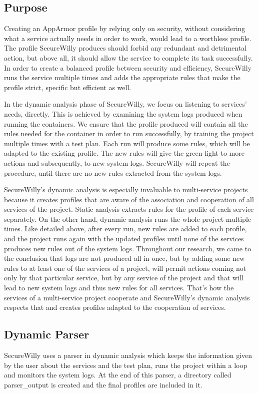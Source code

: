 \subsection{Purpose}
Creating an AppArmor profile by relying only on security, without considering what a service actually needs in order to work, would lead to a worthless profile. The profile SecureWilly produces should forbid any redundant and detrimental action, but above all, it should allow the service to complete its task successfully. In order to create a balanced profile between security and efficiency, SecureWilly runs the service multiple times and adds the appropriate rules that make the profile strict, specific but efficient as well.

In the dynamic analysis phase of SecureWilly, we focus on listening to services' needs, directly. This is achieved by examining the system logs produced when running the containers. We ensure that the profile produced will contain all the rules needed for the container in order to run successfully, by training the project multiple times with a test plan. Each run will produce some rules, which will be adapted to the existing profile. The new rules will give the green light to more actions and subsequently, to new system logs. SecureWilly will repeat the procedure, until there are no new rules extracted from the system logs.

SecureWilly's dynamic analysis is especially invaluable to multi-service projects because it creates profiles that are aware of the association and cooperation of all services of the project. Static analysis extracts rules for the profile of each service separately. On the other hand, dynamic analysis runs the whole project multiple times. Like detailed above, after every run, new rules are added to each profile, and the project runs again with the updated profiles until none of the services produces new rules out of the system logs. Throughout our research, we came to the conclusion that logs are not produced all in once, but by adding some new rules to at least one of the services of a project, will permit actions coming not only by that particular service, but by any service of the project and that will lead to new system logs and thus new rules for all services. That's how the services of a multi-service project cooperate and SecureWilly's dynamic analysis respects that and creates profiles adapted to the cooperation of services.

\subsection{Dynamic Parser}
SecureWilly uses a parser in dynamic analysis which keeps the information given by the user about the services and the test plan, runs the project within a loop and monitors the system logs. At the end of this parser, a directory called parser\_output is created and the final profiles are included in it.

